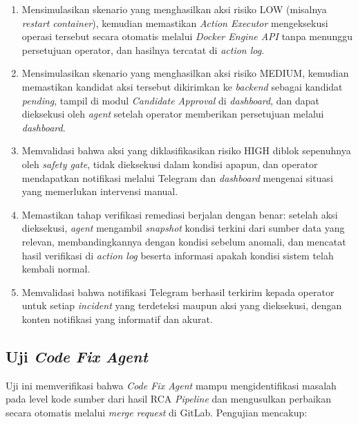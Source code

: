 \begin{enumerate}[label=\arabic*., leftmargin=*]
  \item Mensimulasikan skenario yang menghasilkan aksi risiko LOW (misalnya \textit{restart} \textit{container}), kemudian memastikan \textit{Action Executor} mengeksekusi operasi tersebut secara otomatis melalui \textit{Docker Engine API} tanpa menunggu persetujuan operator, dan hasilnya tercatat di \textit{action log}.
  \item Mensimulasikan skenario yang menghasilkan aksi risiko MEDIUM, kemudian memastikan kandidat aksi tersebut dikirimkan ke \textit{backend} sebagai kandidat \textit{pending}, tampil di modul \textit{Candidate Approval} di \textit{dashboard}, dan dapat dieksekusi oleh \textit{agent} setelah operator memberikan persetujuan melalui \textit{dashboard}.
  \item Memvalidasi bahwa aksi yang diklasifikasikan risiko HIGH diblok sepenuhnya oleh \textit{safety gate}, tidak dieksekusi dalam kondisi apapun, dan operator mendapatkan notifikasi melalui Telegram dan \textit{dashboard} mengenai situasi yang memerlukan intervensi manual.
  \item Memastikan tahap verifikasi remediasi berjalan dengan benar: setelah aksi dieksekusi, \textit{agent} mengambil \textit{snapshot} kondisi terkini dari sumber data yang relevan, membandingkannya dengan kondisi sebelum anomali, dan mencatat hasil verifikasi di \textit{action log} beserta informasi apakah kondisi sistem telah kembali normal.
  \item Memvalidasi bahwa notifikasi Telegram berhasil terkirim kepada operator untuk setiap \textit{incident} yang terdeteksi maupun aksi yang dieksekusi, dengan konten notifikasi yang informatif dan akurat.
\end{enumerate}

\subsection{Uji \textit{Code Fix Agent}}

Uji ini memverifikasi bahwa \textit{Code Fix Agent} mampu mengidentifikasi masalah pada level kode sumber dari hasil RCA \textit{Pipeline} dan mengusulkan perbaikan secara otomatis melalui \textit{merge request} di GitLab. Pengujian mencakup:

